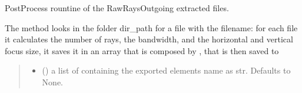 \documentclass[letterpaper,10pt,english]{sphinxmanual}
\begin{document}
\begin{fulllineitems}
\begin{fulllineitems}
\label{\detokenize{API:raypyng.postprocessing.PostProcess.postprocess_RawRays}}
\pysigstartsignatures
{}
\pysigstopsignatures
\sphinxAtStartPar
PostProcess rountine of the RawRaysOutgoing extracted files.

\sphinxAtStartPar
The method looks in the folder dir\_path for a file with the filename:
for each file it calculates the number of rays, the bandwidth, and the horizontal and vertical focus size,
it saves it in an array that is composed by , that is then saved to
\begin{quote}\begin{description}
\begin{itemize}
\item {} 
\sphinxAtStartPar
{} (\sphinxstyleliteralemphasis{\sphinxupquote{, }}) \textendash{} a list of containing the exported elements name as str. Defaults to None.


\end{itemize}
\end{description}
\end{quote}
\end{fulllineitems}
\end{fulllineitems}
\end{document}
